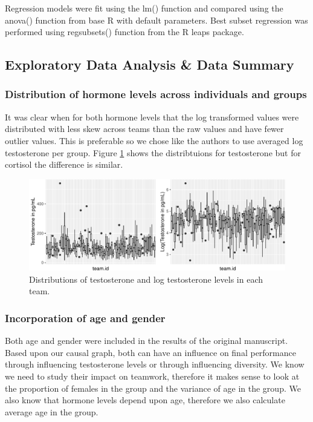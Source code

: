 \documentclass[]{article}
\begin{document}
Regression models were fit using the lm() function and compared using
the anova() function from base R with default parameters. Best subset
regression was performed using regsubsets() function from the R leaps
package.

\hypertarget{exploratory-data-analysis-data-summary}{%
\subsection{Exploratory Data Analysis \& Data
Summary}\label{exploratory-data-analysis-data-summary}}

\hypertarget{distribution-of-hormone-levels-across-individuals-and-groups}{%
\subsubsection{Distribution of hormone levels across individuals and
groups}\label{distribution-of-hormone-levels-across-individuals-and-groups}}

It was clear when for both hormone levels that the log transformed
values were distributed with less skew across teams than the raw values
and have fewer outlier values. This is preferable so we chose like the
authors to use averaged log testosterone per group. Figure
\ref{fig:test} shows the distribtuions for testosterone but for cortisol
the difference is similar.

\begin{figure}
\centering
\includegraphics{19_10_02_hw5_q1_files/figure-latex/test-1.pdf}
\caption{\label{fig:test}Distributions of testosterone and log
testosterone levels in each team.}
\end{figure}

\hypertarget{incorporation-of-age-and-gender}{%
\subsubsection{Incorporation of age and
gender}\label{incorporation-of-age-and-gender}}

Both age and gender were included in the results of the original
manuscript. Based upon our causal graph, both can have an influence on
final performance through influencing testosterone levels or through
influencing diversity. We know we need to study their impact on
teamwork, therefore it makes sense to look at the proportion of females
in the group and the variance of age in the group. We also know that
hormone levels depend upon age, therefore we also calculate average age
in the group.
\end{document}
